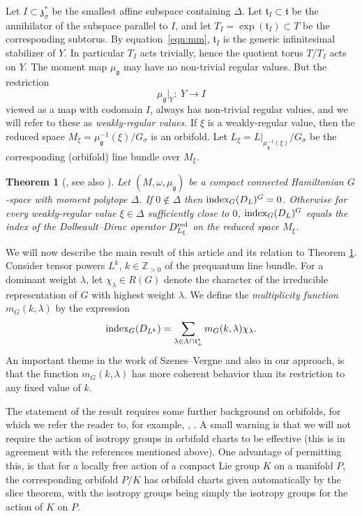 \documentclass[pdftex]{sigma}
\numberwithin{equation}{section}
\newtheorem{Theorem}{Theorem}[section]
\newcommand{\tn}[1]{\textnormal{#1}}
\def\g{\ensuremath{\mathfrak{g}}}
\def\z{\ensuremath{\mathfrak{z}}}
\def\t{\ensuremath{\mathfrak{t}}}
\def\bZ{\ensuremath{\mathbb{Z}}}
\def\index{\ensuremath{\textnormal{index}}}
\begin{document}
Let $I \subset \z_\sigma^\ast$ be the smallest affine subspace containing $\Delta$. Let $\t_I\subset \t$ be the annihilator of the subspace parallel to $I$, and let $T_I=\exp(\t_I)\subset T$ be the corresponding subtorus. By equation~\eqref{eqn:mm}, $\t_I$ is the generic infinitesimal stabilizer of $Y$. In particular $T_I$ acts trivially, hence the quotient torus $T/T_I$ acts on $Y$. The moment map $\mu_\g$ may have no non-trivial regular values. But the restriction
\[\mu_\g|_Y\colon \ Y \rightarrow I\]
viewed as a map with codomain $I$, always has non-trivial regular values, and we will refer to these as \emph{weakly-regular values}. If $\xi$ is a weakly-regular value, then the reduced space $M_\xi=\mu_\g^{-1}(\xi)/G_\sigma$ is an orbifold. Let $L_\xi=L|_{\mu_\g^{-1}(\xi)}/G_\sigma$ be the corresponding (orbifold) line bundle over $M_\xi$.

\begin{Theorem}[\cite{MeinrenkenSjamaar}, see also \cite{ParadanRiemannRoch,WittenNonAbelian}]
\label{thm:MeinSja}
Let $(M,\omega,\mu_\g)$ be a compact connected Hamiltonian $G$-space with moment polytope $\Delta$. If $0 \notin \Delta$ then $\index_G(D_L)^G=0$. Otherwise for every weakly-regular value $\xi \in \Delta$ sufficiently close to $0$, $\index_G(D_L)^G$ equals the index of the Dolbeault--Dirac operator $D^{\tn{red}}_{L_\xi}$ on the reduced space $M_\xi$.
\end{Theorem}

We will now describe the main result of this article and its relation to Theorem \ref{thm:MeinSja}. Consider tensor powers $L^k$, $k \in \bZ_{>0}$ of the prequantum line bundle. For a dominant weight $\lambda$, let $\chi_\lambda \in R(G)$ denote the character of the irreducible representation of $G$ with highest weight $\lambda$. We define the \emph{multiplicity function} $m_G(k,\lambda)$ by the expression
\begin{gather}
\label{eqn:multfcn}
\index_G(D_{L^k})=\sum_{\lambda \in \Lambda \cap \t_+^\ast} m_G(k,\lambda)\chi_\lambda.
\end{gather}
An important theme in the work of Szenes--Vergne \cite{SzenesVergne2010} and also in our approach, is that the function $m_G(k,\lambda)$ has more coherent behavior than its restriction to any fixed value of $k$.

The statement of the result requires some further background on orbifolds, for which we refer the reader to, for example, \cite[Appendix A]{daSilvaThesis}, \cite[Section 2]{MeinrenkenSymplecticSurgery}. A small warning is that we will not require the action of isotropy groups in orbifold charts to be effective (this is in agreement with the references \cite{daSilvaThesis,MeinrenkenSymplecticSurgery} mentioned above). One advantage of permitting this, is that for a locally free action of a compact Lie group $K$ on a manifold $P$, the corresponding orbifold $P/K$ has orbifold charts given automatically by the slice theorem, with the isotropy groups being simply the isotropy groups for the action of $K$ on $P$.
\end{document}
